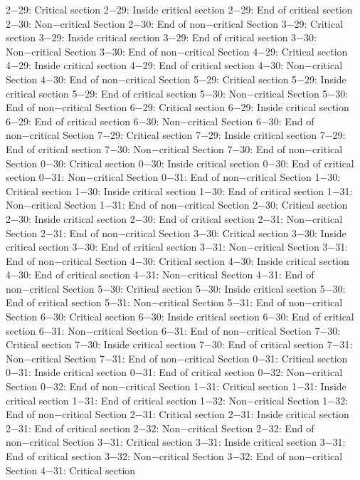 2−29: Critical section
2−29: Inside critical section
2−29: End of critical section
2−30: Non−critical Section
2−30: End of non−critical Section
3−29: Critical section
3−29: Inside critical section
3−29: End of critical section
3−30: Non−critical Section
3−30: End of non−critical Section
4−29: Critical section
4−29: Inside critical section
4−29: End of critical section
4−30: Non−critical Section
4−30: End of non−critical Section
5−29: Critical section
5−29: Inside critical section
5−29: End of critical section
5−30: Non−critical Section
5−30: End of non−critical Section
6−29: Critical section
6−29: Inside critical section
6−29: End of critical section
6−30: Non−critical Section
6−30: End of non−critical Section
7−29: Critical section
7−29: Inside critical section
7−29: End of critical section
7−30: Non−critical Section
7−30: End of non−critical Section
0−30: Critical section
0−30: Inside critical section
0−30: End of critical section
0−31: Non−critical Section
0−31: End of non−critical Section
1−30: Critical section
1−30: Inside critical section
1−30: End of critical section
1−31: Non−critical Section
1−31: End of non−critical Section
2−30: Critical section
2−30: Inside critical section
2−30: End of critical section
2−31: Non−critical Section
2−31: End of non−critical Section
3−30: Critical section
3−30: Inside critical section
3−30: End of critical section
3−31: Non−critical Section
3−31: End of non−critical Section
4−30: Critical section
4−30: Inside critical section
4−30: End of critical section
4−31: Non−critical Section
4−31: End of non−critical Section
5−30: Critical section
5−30: Inside critical section
5−30: End of critical section
5−31: Non−critical Section
5−31: End of non−critical Section
6−30: Critical section
6−30: Inside critical section
6−30: End of critical section
6−31: Non−critical Section
6−31: End of non−critical Section
7−30: Critical section
7−30: Inside critical section
7−30: End of critical section
7−31: Non−critical Section
7−31: End of non−critical Section
0−31: Critical section
0−31: Inside critical section
0−31: End of critical section
0−32: Non−critical Section
0−32: End of non−critical Section
1−31: Critical section
1−31: Inside critical section
1−31: End of critical section
1−32: Non−critical Section
1−32: End of non−critical Section
2−31: Critical section
2−31: Inside critical section
2−31: End of critical section
2−32: Non−critical Section
2−32: End of non−critical Section
3−31: Critical section
3−31: Inside critical section
3−31: End of critical section
3−32: Non−critical Section
3−32: End of non−critical Section
4−31: Critical section
